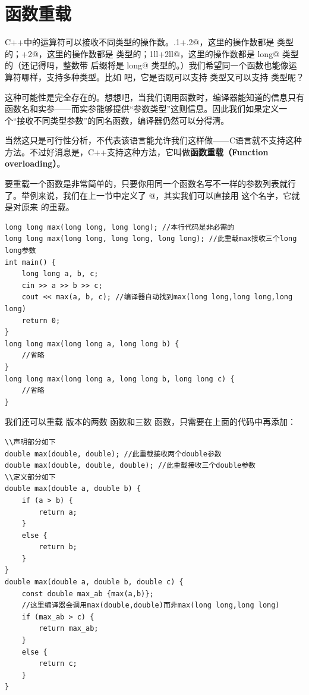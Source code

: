 \section{函数重载}
C++中的运算符可以接收不同类型的操作数。\lstinline@.1+.2@，这里的操作数都是 \lstinline@double@ 类型的；+2@，这里的操作数都是 \lstinline@int@ 类型的；\lstinline@1ll+2ll@，这里的操作数都是 \lstinline@long long@ 类型的（还记得吗，整数带 \lstinline@ll@ 后缀将是 \lstinline@long long@ 类型的。）我们希望同一个函数也能像运算符哪样，支持多种类型。比如 \lstinline@max@ 吧，它是否既可以支持 \lstinline@double@ 类型又可以支持 \lstinline@int@ 类型呢？\par
这种可能性是完全存在的。想想吧，当我们调用函数时，编译器能知道的信息只有函数名和实参——而实参能够提供``参数类型''这则信息。因此我们如果定义一个``接收不同类型参数''的同名函数，编译器仍然可以分得清。\par
当然这只是可行性分析，不代表该语言能允许我们这样做——C语言就不支持这种方法。不过好消息是，C++支持这种方法，它叫做\textbf{函数重载（Function overloading）}。\par
要重载一个函数是非常简单的，只要你用同一个函数名写不一样的参数列表就行了。举例来说，我们在上一节中定义了 @，其实我们可以直接用 \lstinline@max@ 这个名字，它就是对原来 \lstinline@max@ 的重载。
\begin{lstlisting}
long long max(long long, long long); //本行代码是非必需的
long long max(long long, long long, long long); //此重载max接收三个long long参数
int main() {
    long long a, b, c;
    cin >> a >> b >> c;
    cout << max(a, b, c); //编译器自动找到max(long long,long long,long long)
    return 0;
}
long long max(long long a, long long b) {
    //省略
}
long long max(long long a, long long b, long long c) {
    //省略
}
\end{lstlisting}
我们还可以重载 \lstinline@double@ 版本的两数 \lstinline@max@ 函数和三数 \lstinline@max@ 函数，只需要在上面的代码中再添加：
\begin{lstlisting}
\\声明部分如下
double max(double, double); //此重载接收两个double参数
double max(double, double, double); //此重载接收三个double参数
\\定义部分如下
double max(double a, double b) {
    if (a > b) {
        return a;
    }
    else {
        return b;
    }
}
double max(double a, double b, double c) {
    const double max_ab {max(a,b)};
    //这里编译器会调用max(double,double)而非max(long long,long long)
    if (max_ab > c) {
        return max_ab;
    }
    else {
        return c;
    }
}
\end{lstlisting}
